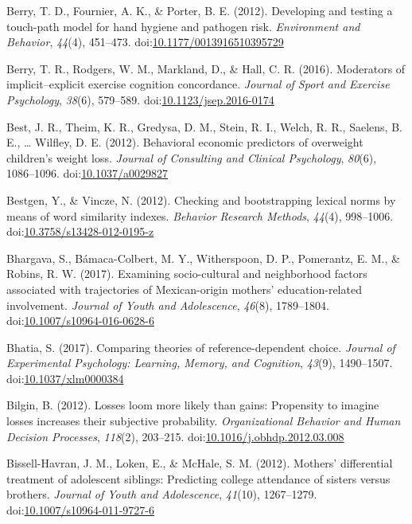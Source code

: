 \documentclass[english,man]{apa6}
\begin{document}
\hypertarget{ref-Berry2012}{}
Berry, T. D., Fournier, A. K., \& Porter, B. E. (2012). Developing and
testing a touch-path model for hand hygiene and pathogen risk.
\emph{Environment and Behavior}, \emph{44}(4), 451--473.
doi:\href{https://doi.org/10.1177/0013916510395729}{10.1177/0013916510395729}

\hypertarget{ref-Berry2016}{}
Berry, T. R., Rodgers, W. M., Markland, D., \& Hall, C. R. (2016).
Moderators of implicit--explicit exercise cognition concordance.
\emph{Journal of Sport and Exercise Psychology}, \emph{38}(6), 579--589.
doi:\href{https://doi.org/10.1123/jsep.2016-0174}{10.1123/jsep.2016-0174}

\hypertarget{ref-Best2012}{}
Best, J. R., Theim, K. R., Gredysa, D. M., Stein, R. I., Welch, R. R.,
Saelens, B. E., \ldots{} Wilfley, D. E. (2012). Behavioral economic
predictors of overweight children's weight loss. \emph{Journal of
Consulting and Clinical Psychology}, \emph{80}(6), 1086--1096.
doi:\href{https://doi.org/10.1037/a0029827}{10.1037/a0029827}

\hypertarget{ref-Bestgen2012}{}
Bestgen, Y., \& Vincze, N. (2012). Checking and bootstrapping lexical
norms by means of word similarity indexes. \emph{Behavior Research
Methods}, \emph{44}(4), 998--1006.
doi:\href{https://doi.org/10.3758/s13428-012-0195-z}{10.3758/s13428-012-0195-z}

\hypertarget{ref-Bhargava2017}{}
Bhargava, S., Bámaca-Colbert, M. Y., Witherspoon, D. P., Pomerantz, E.
M., \& Robins, R. W. (2017). Examining socio-cultural and neighborhood
factors associated with trajectories of Mexican-origin mothers'
education-related involvement. \emph{Journal of Youth and Adolescence},
\emph{46}(8), 1789--1804.
doi:\href{https://doi.org/10.1007/s10964-016-0628-6}{10.1007/s10964-016-0628-6}

\hypertarget{ref-Bhatia2017}{}
Bhatia, S. (2017). Comparing theories of reference-dependent choice.
\emph{Journal of Experimental Psychology: Learning, Memory, and
Cognition}, \emph{43}(9), 1490--1507.
doi:\href{https://doi.org/10.1037/xlm0000384}{10.1037/xlm0000384}

\hypertarget{ref-Bilgin2012}{}
Bilgin, B. (2012). Losses loom more likely than gains: Propensity to
imagine losses increases their subjective probability.
\emph{Organizational Behavior and Human Decision Processes},
\emph{118}(2), 203--215.
doi:\href{https://doi.org/10.1016/j.obhdp.2012.03.008}{10.1016/j.obhdp.2012.03.008}

\hypertarget{ref-Bissell-Havran2012}{}
Bissell-Havran, J. M., Loken, E., \& McHale, S. M. (2012). Mothers'
differential treatment of adolescent siblings: Predicting college
attendance of sisters versus brothers. \emph{Journal of Youth and
Adolescence}, \emph{41}(10), 1267--1279.
doi:\href{https://doi.org/10.1007/s10964-011-9727-6}{10.1007/s10964-011-9727-6}
\end{document}
